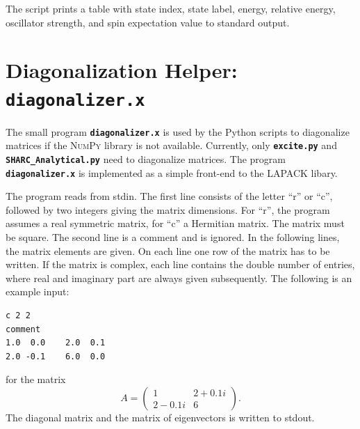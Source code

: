 \documentclass[a4paper,10pt,DIV=15,openany,twoside=false]{scrbook}
\newcommand{\ttt}[1]{\textbf{\texttt{#1}}}
\newenvironment{example}{
  \setlength{\OuterFrameSep}{3pt}
  \vspace{0mm}
  \definecolor{shadecolor}{HTML}{E4F4FF}
  \begin{shaded}
}{
  \end{shaded}
}
\begin{document}
The script prints a table with state index, state label, energy, relative energy, oscillator strength, and spin expectation value to standard output.











\section{Diagonalization Helper: \ttt{diagonalizer.x}}\label{sec:diagonalizer.x}

The small program \ttt{diagonalizer.x} is used by the Python scripts to diagonalize matrices if the \textsc{NumPy} library is not available. Currently, only \ttt{excite.py} and \ttt{SHARC\_Analytical.py} need to diagonalize matrices. The program \ttt{diagonalizer.x} is implemented as a simple front-end to the LAPACK libary.

The program reads from stdin. The first line consists of the letter ``r'' or ``c'', followed by two integers giving the matrix dimensions. For ``r'', the program assumes a real symmetric matrix, for ``c'' a Hermitian matrix. The matrix must be square.
The second line is a comment and is ignored.
In the following lines, the matrix elements are given. On each line one row of the matrix has to be written. If the matrix is complex, each line contains the double number of entries, where real and imaginary part are always given subsequently.
The following is an example input:
\begin{example}
\footnotesize\begin{verbatim}
c 2 2
comment
1.0  0.0    2.0  0.1
2.0 -0.1    6.0  0.0
\end{verbatim}
\end{example}

\normalsize
for the matrix 
\begin{equation}
  A=\begin{pmatrix}
      1 &2+0.1i\\
      2-0.1i&6
    \end{pmatrix}.
\end{equation}
The diagonal matrix and the matrix of eigenvectors is written to stdout.



\end{document}
